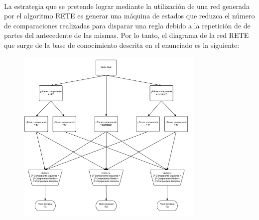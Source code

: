 \documentclass[10pt, a4paper,spanish]{article}
\begin{document}
		\paragraph{}
		La estrategia que se pretende lograr mediante la utilización de una red generada por el algoritmo RETE es generar una máquina de estados que reduzca el número de comparaciones realizadas para disparar una regla debido a la repetición de de partes del antecedente de las mismas. Por lo tanto, el diagrama de la red RETE que surge de la base de conocimiento descrita en el enunciado es la siguiente:

		\begin{figure}[H]
			\begin{center}
				\includegraphics[width=0.8\textwidth]{rete-graph}
			\end{center}
		\end{figure}
\end{document}
